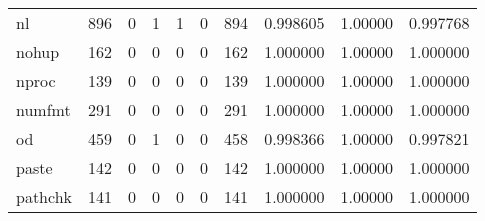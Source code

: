 \begin{longtable}{lrrrrrrrrr}
nl        &                    896 &                                  0 &                                 1 &                                1 &                                 0 &                             894 &                                0.998605 &                                1.00000 &                             0.997768 \\
nohup     &                    162 &                                  0 &                                 0 &                                0 &                                 0 &                             162 &                                1.000000 &                                1.00000 &                             1.000000 \\
nproc     &                    139 &                                  0 &                                 0 &                                0 &                                 0 &                             139 &                                1.000000 &                                1.00000 &                             1.000000 \\
numfmt    &                    291 &                                  0 &                                 0 &                                0 &                                 0 &                             291 &                                1.000000 &                                1.00000 &                             1.000000 \\
od        &                    459 &                                  0 &                                 1 &                                0 &                                 0 &                             458 &                                0.998366 &                                1.00000 &                             0.997821 \\
paste     &                    142 &                                  0 &                                 0 &                                0 &                                 0 &                             142 &                                1.000000 &                                1.00000 &                             1.000000 \\
pathchk   &                    141 &                                  0 &                                 0 &                                0 &                                 0 &                             141 &                                1.000000 &                                1.00000 &                             1.000000 \\

\end{longtable}
